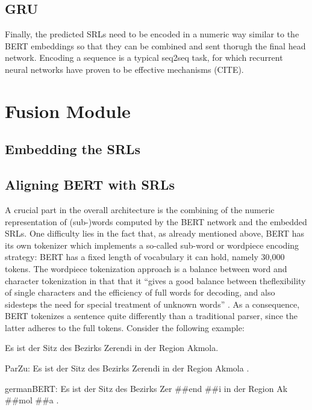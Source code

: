 \subsection{GRU}

Finally, the predicted SRLs need to be encoded in a numeric way similar to the BERT embeddings so that they can be combined and sent thorugh the final head network.
Encoding a sequence is a typical seq2seq task, for which recurrent neural networks have proven to be effective mechanisms (CITE).

\section{Fusion Module}

\subsection{Embedding the SRLs}

\subsection{Aligning BERT with SRLs}

A crucial part in the overall architecture is the combining of the numeric representation of (sub-)words computed by the BERT network and the embedded SRLs.
One difficulty lies in the fact that, as already mentioned above, BERT has its own tokenizer which implements a so-called sub-word or wordpiece \cite{wu2016google} encoding strategy:
BERT has a fixed length of vocabulary it can hold, namely 30,000 tokens.
The wordpiece tokenization approach is a balance between word and character tokenization in that that it ``gives a good balance between theflexibility of single characters and the efficiency of full words for decoding, and also sidesteps the need for special treatment of unknown words'' \citep[p.~2]{wu2016google}.
As a consequence, BERT tokenizes a sentence quite differently than a traditional parser, since the latter adheres to the full tokens.
Consider the following example:

\begin{examples}
	\label{ex:tokenization-diff}
	\item Es ist der Sitz des Bezirks Zerendi in der Region Akmola.
	\item ParZu: Es ist der Sitz des Bezirks Zerendi in der Region Akmola .
	\item germanBERT: Es ist der Sitz des Bezirks Zer \#\#end \#\#i in der Region Ak \#\#mol \#\#a .
\end{examples}


